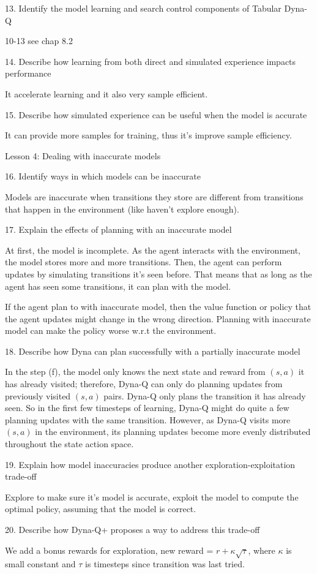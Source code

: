 \documentclass[sutton_barto_notes.tex]{subfiles}
\begin{document}
13. Identify the model learning and search control components of Tabular Dyna-Q 

10-13 see chap 8.2

14. Describe how learning from both direct and simulated experience impacts performance 

It accelerate learning and it also very sample efficient.

15. Describe how simulated experience can be useful when the model is accurate 

It can provide more samples for training, thus it's improve sample efficiency.

Lesson 4: Dealing with inaccurate models 

16. Identify ways in which models can be inaccurate 

Models are inaccurate when transitions they store are different from transitions that happen in the environment (like haven't explore enough).

17. Explain the effects of planning with an inaccurate model 

At first, the model is incomplete. As the agent interacts with the environment, the model stores more and more transitions. Then, the agent can perform updates by simulating transitions it's seen before. That means that as long as the agent has seen some transitions, it can plan with the model.

If the agent plan to with inaccurate model, then the value function or policy that the agent updates might change in the wrong direction. Planning with inaccurate model can make the policy worse w.r.t the environment.

18. Describe how Dyna can plan successfully with a partially inaccurate model 

In the step (f), the model only knows the next state and reward from $(s,a)$ it has already visited; therefore, Dyna-Q can only do planning updates from previously visited $(s,a)$ pairs. Dyna-Q only plans the transition it has already seen. So in the first few timesteps of learning, Dyna-Q might do quite a few planning updates with the same transition. However, as Dyna-Q visits more $(s,a)$ in the environment, its planning updates become more evenly distributed throughout the state action space.

19. Explain how model inaccuracies produce another exploration-exploitation trade-off 

Explore to make sure it's model is accurate, exploit the model to compute the optimal policy, assuming that the model is correct.

20. Describe how Dyna-Q+ proposes a way to address this trade-off

We add a bonus rewards for exploration, new reward = $r + \kappa\sqrt{\tau}$, where $\kappa$ is small constant and $\tau$ is timesteps since transition was last tried.
\end{document}
